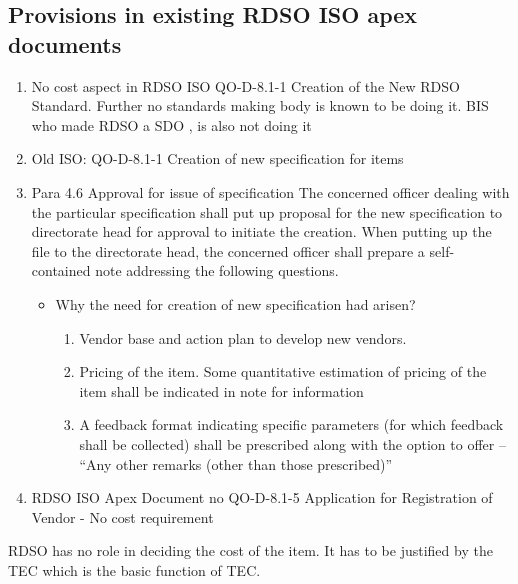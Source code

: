 \documentclass[
  10pt,
  twoside]{article}
\providecommand{\tightlist}{%
  \setlength{\itemsep}{0pt}\setlength{\parskip}{0pt}}
\begin{document}
\hypertarget{provisions-in-existing-rdso-iso-apex-documents}{%
\subsection{Provisions in existing RDSO ISO apex
documents}\label{provisions-in-existing-rdso-iso-apex-documents}}

\begin{enumerate}
\def\labelenumi{\arabic{enumi}.}
\item
  No cost aspect in RDSO ISO QO-D-8.1-1 Creation of the New RDSO
  Standard. Further no standards making body is known to be doing it.
  BIS who made RDSO a SDO , is also not doing it
\item
  Old ISO: QO-D-8.1-1 Creation of new specification for items
\item
  Para 4.6 Approval for issue of specification The concerned officer
  dealing with the particular specification shall put up proposal for
  the new specification to directorate head for approval to initiate the
  creation. When putting up the file to the directorate head, the
  concerned officer shall prepare a self-contained note addressing the
  following questions.

  \begin{itemize}
  \item
    Why the need for creation of new specification had arisen?

    \begin{enumerate}
    \def\labelenumii{\alph{enumii})}
    \tightlist
    \item
      Vendor base and action plan to develop new vendors.
    \item
      Pricing of the item. Some quantitative estimation of pricing of
      the item shall be indicated in note for information
    \item
      A feedback format indicating specific parameters (for which
      feedback shall be collected) shall be prescribed along with the
      option to offer -- ``Any other remarks (other than those
      prescribed)''
    \end{enumerate}
  \end{itemize}
\item
  RDSO ISO Apex Document no QO-D-8.1-5 Application for Registration of
  Vendor - No cost requirement
\end{enumerate}

RDSO has no role in deciding the cost of the item. It has to be
justified by the TEC which is the basic function of TEC.
\end{document}

